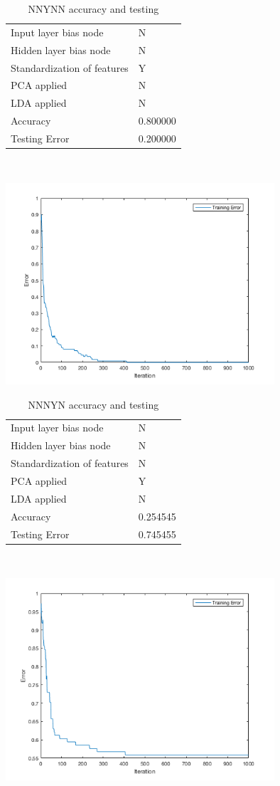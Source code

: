 \documentclass[12pt]{article}
\newcommand{\accuracyAndTestErrorTable}[8]{
  \begin{tabular}{l|l}
    \hline
    Input layer bias node & #1 \\
    Hidden layer bias node & #2 \\
    Standardization of features & #3 \\
    PCA applied & #4 \\
    LDA applied & #5 \\
    \hline
    Accuracy & #6 \\
    Testing Error & #7 \\
    \hline
  \end{tabular}
  ~\\[60pt]
  \caption{#8}
}
\begin{document}
\begin{center}
  \begin{table}[H]
    \begin{varwidth}[b]{0.4\linewidth}
      \centering
      \accuracyAndTestErrorTable{N}{N}{Y}{N}{N}{0.800000}{0.200000}{NNYNN accuracy and testing}
      \label{table:NNYNN}
    \end{varwidth}%
    \hfill
    \begin{minipage}[b]{0.6\linewidth}
      \centering
      \includegraphics[width=100mm]{NNYNN_training_error.png}
      \label{fig:NNYNN}
    \end{minipage}
  \end{table}
\end{center}

\begin{center}
  \begin{table}[H]
    \begin{varwidth}[b]{0.4\linewidth}
      \centering
      \accuracyAndTestErrorTable{N}{N}{N}{Y}{N}{0.254545}{0.745455}{NNNYN accuracy and testing}
      \label{table:NNNYN}
    \end{varwidth}%
    \hfill
    \begin{minipage}[b]{0.6\linewidth}
      \centering
      \includegraphics[width=100mm]{NNNYN_training_error.png}
      \label{fig:NNNYN}
    \end{minipage}
  \end{table}
\end{center}
\end{document}
